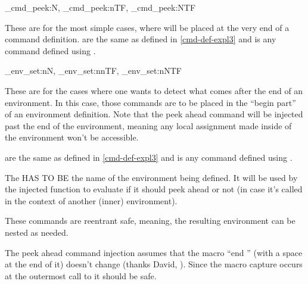 \documentclass[10pt]{article}
\begin{document}
\begin{codedescribe}[code,update=2025/10/07]{\xpeekahead_cmd_peek:N, \xpeekahead_cmd_peek:nTF, \xpeekahead_cmd_peek:NTF}
\begin{codesyntax}%
\end{codesyntax}
These are for the most simple cases, where  will be placed at the very end of a command definition.  are the same as defined in \ref{cmd-def-expl3} and  is any command defined using .
\end{codedescribe}


\begin{codedescribe}[code,update=2025/10/07]{\xpeekahead_env_set:nN, \xpeekahead_env_set:nnTF, \xpeekahead_env_set:nNTF}
\begin{codesyntax}%
\end{codesyntax}
These are for the cases where one wants to detect what comes after the end of an environment. In this case, those commands are to be placed in the ``begin part'' of an environment definition. Note that the peek ahead command will be injected past the end of the environment, meaning any local assignment made inside of the environment won't be accessible. 

 are the same as defined in \ref{cmd-def-expl3} and  is any command defined using .
\end{codedescribe}
\begin{tsremark}
  The  HAS TO BE the name of the environment being defined. It will be used by the injected function to evaluate if it should peek ahead or not (in case it's called in the context of another  (inner) environment).
\end{tsremark}
\begin{tsremark}
  These commands are reentrant safe, meaning, the resulting environment can be nested as needed.
\end{tsremark}
\begin{tsremark}
  The peek ahead command injection assumes that the macro ``end '' (with a space at the end of it) doesn't change (thanks David, \cite{stackexchange}). Since the macro capture occurs at the outermost call to  it should be safe.
\end{tsremark}
\end{document}
